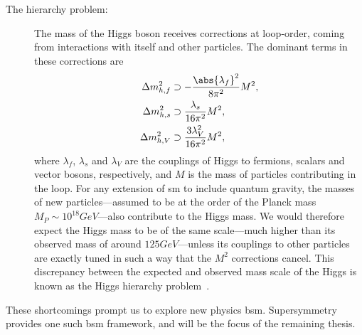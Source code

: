 \begin{description}
    \item[The hierarchy problem:]
    The mass of the Higgs boson receives corrections at loop-order, coming from interactions with itself and other particles. The dominant terms in these corrections are
    \begin{subequations}
    \label{eq:hierarchy_problem}
    \begin{align}
        \Delta m_{h,f}^2 &\supset -\frac{\abs{\lambda_f}^2}{8\pi^2} M^2,
        \\
        \Delta m_{h,s}^2 &\supset \frac{\lambda_s}{16\pi^2} M^2,
        \\
        \Delta m_{h,V}^2 &\supset \frac{3\lambda_V^2}{16\pi^2} M^2,
    \end{align}
    \end{subequations}
    where $\lambda_f$, $\lambda_s$ and $\lambda_V$ are the couplings of Higgs to fermions, scalars and vector bosons, respectively, and $M$ is the mass of particles contributing in the loop. For any extension of \gls{sm} to include quantum gravity, the masses of new particles---assumed to be at the order of the Planck mass $M_P\sim10^{18}\unit{GeV}$---also contribute to the Higgs mass.
    We would therefore expect the Higgs mass to be of the same scale---much higher than its observed mass of around $125\unit{GeV}$---unless its couplings to other particles are exactly tuned in such a way that the $M^2$ corrections cancel.
    This discrepancy between the expected and observed mass scale of the Higgs is known as the Higgs hierarchy problem~\cite{Peskin:2025lsg}.
\end{description}
These shortcomings prompt us to explore new physics \gls{bsm}.
Supersymmetry provides one such \gls{bsm} framework, and will be the focus of the remaining thesis.


